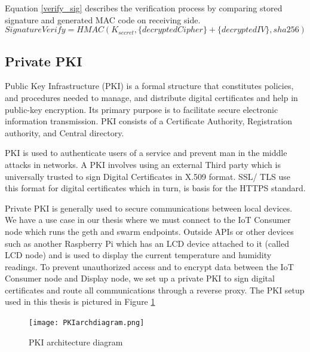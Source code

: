 \documentclass[11pt,openright]{report}
\begin{document}
Equation \ref{verify_sig} describes the verification process by comparing stored signature and generated MAC code on receiving side.
\begin{equation}\label{verify_sig}
    SignatureVerify 
    = HMAC(K_{secret}, \{decryptedCipher\} + \{decryptedIV\}, sha256)
\end{equation}


\subsection{Private PKI} \label{priv_pki}
Public Key Infrastructure (PKI) is a formal structure that constitutes policies, and procedures needed to manage, and distribute digital certificates and help in public-key encryption. Its primary purpose is to facilitate secure electronic information transmission. PKI consists of a Certificate Authority, Registration authority, and Central directory.

PKI is used to authenticate users of a service and prevent man in the middle attacks in networks. A PKI involves using an external Third party which is universally trusted to sign Digital Certificates in X.509 format. SSL/ TLS use this format for digital certificates which in turn, is basis for the HTTPS standard.

Private PKI is generally used to secure communications between local devices. We have a use case in our thesis where we must connect to the IoT Consumer node which runs the geth and swarm endpoints. Outside APIs or other devices such as another Raspberry Pi which has an LCD device attached to it (called LCD node) and is used to display the current temperature and humidity readings. To prevent unauthorized access and to encrypt data between the IoT Consumer node and Display node, we set up a private PKI to sign digital certificates and route all communications through a reverse proxy. The PKI setup used in this thesis is pictured in Figure \ref{fig:pkiarch}
\newline
\newline
\begin{figure}[!htbp]
	\centering
	\texttt{[image: PKIarchdiagram.png]}
	\caption{PKI architecture diagram}
	\label{fig:pkiarch}
\end{figure}
\newline
\newline
\end{document}
